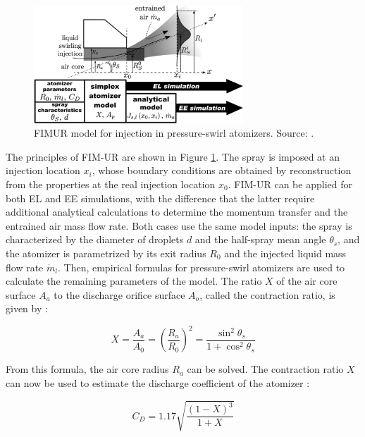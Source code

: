 \begin{figure}[ht]
    \centering
    \includegraphics[width=0.7\textwidth]{./part1_numerical_approaches/figures_ch3/FIMUR}
       \centering
    \caption[FIMUR model for injection in pressure-swirl atomizers]{FIMUR model for injection in pressure-swirl atomizers. Source: .}
    \label{fig:FIMUR_methodology}
\end{figure}

The principles of FIM-UR are shown in Figure \ref{fig:FIMUR_methodology}. The spray is imposed at an injection location $x_i$, whose boundary conditions are obtained by reconstruction from the properties at the real injection location $x_0$. FIM-UR can be applied for both EL and EE simulations, with the difference that the latter require additional analytical calculations to determine the momentum transfer and the entrained air mass flow rate. Both cases use the same model inputs: the spray is characterized by the diameter of droplets $d$ and the half-spray mean angle $\theta_s$, and the atomizer is parametrized by its exit radius $R_0$ and the injected liquid mass flow rate $\dot{m}_l$. Then, empirical formulas for pressure-swirl atomizers are used to calculate the remaining parameters of the model. The ratio $X$ of the air core surface $A_a$ to the discharge orifice surface $A_o$, called the contraction ratio, is given by :

\begin{equation}
X = \frac{A_a}{A_0} = \left( \frac{R_a}{R_0} \right)^2 = \frac{\sin^2 \theta_s}{1 + \cos^2 \theta_s}
\end{equation}

From this formula, the air core radius $R_a$ can be solved. The contraction ratio $X$ can now be used to estimate the discharge coefficient of the atomizer :

\begin{equation}
C_D = 1.17 \sqrt{\frac{\left( 1 - X \right)^3}{1 + X}}
\end{equation}

